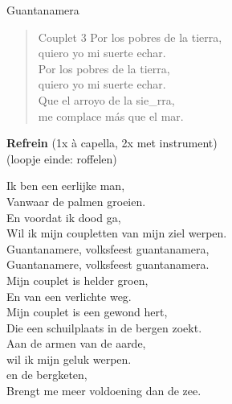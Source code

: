 \begin{song}[son]{Guantanamera}

\begin{verse}{Couplet 3}
  \hspace{1em} Por los pobres de la tierra,
  \\
  \hspace{1em} quiero yo mi suerte echar.
  \\
  \hspace{1em} Por los pobres de la tierra,
  \\
  quiero yo mi suerte echar.
  \\
  Que el arroyo de la sie\_rra,
  \\
  me complace m\'{a}s que el mar. \hspace{1em}
\end{verse}

\textbf{Refrein} (1x \`{a} capella, 2x met instrument)\\
(loopje einde:  roffelen)
\end{song}

\clearpage
\begin{translation}
Ik ben een eerlijke man,\\
Vanwaar de palmen groeien.\\
En voordat ik dood ga,\\
Wil ik mijn coupletten van mijn ziel werpen.\\
\vspace*{1\baselineskip}
Guantanamere, volksfeest guantanamera,\\
Guantanamere, volksfeest guantanamera.\\
\vspace*{1\baselineskip}
Mijn couplet is helder groen,\\
En van een verlichte weg.\\
Mijn couplet is een gewond hert,\\
Die een schuilplaats in de bergen zoekt.\\
\vspace*{1\baselineskip}
Aan de armen van de aarde,\\
wil ik mijn geluk werpen.\\
en de bergketen,\\
Brengt me meer voldoening dan de zee.\\
\end{translation}
